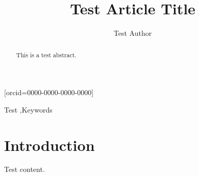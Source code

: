 \documentclass[a4paper,fleqn]{cas-dc}
\begin{document}
\let\WriteBookmarks\relax
\def\floatpagepagefraction{1}
\def\textpagefraction{.001}


\title[mode=title]{Test Article Title}

\author[1]{Test Author}[orcid=0000-0000-0000-0000]

\begin{abstract}
This is a test abstract.
\end{abstract}

\begin{keywords}
Test \sep Keywords
\end{keywords}

\maketitle

\section{Introduction}
Test content.
\end{document}
